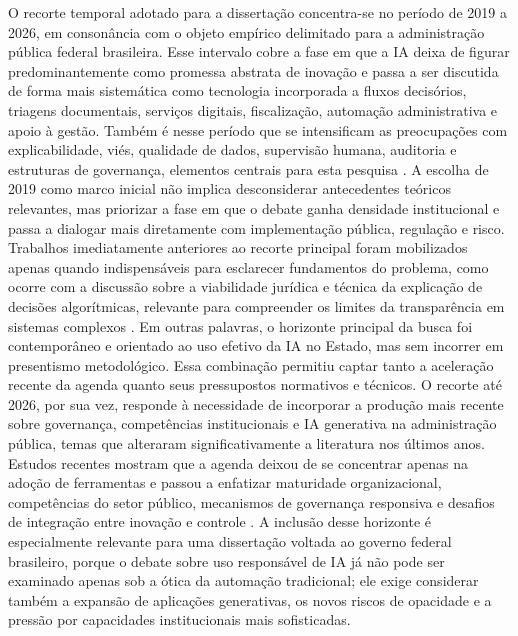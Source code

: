 \documentclass[12pt,a4paper]{article}
\begin{document}
O recorte temporal adotado para a dissertação concentra-se no período de 2019 a 2026, em consonância com o objeto empírico delimitado para a administração pública federal brasileira. Esse intervalo cobre a fase em que a IA deixa de figurar predominantemente como promessa abstrata de inovação e passa a ser discutida de forma mais sistemática como tecnologia incorporada a fluxos decisórios, triagens documentais, serviços digitais, fiscalização, automação administrativa e apoio à gestão. Também é nesse período que se intensificam as preocupações com explicabilidade, viés, qualidade de dados, supervisão humana, auditoria e estruturas de governança, elementos centrais para esta pesquisa \autocite{parycek2023artificial} \autocite{mkander2023auditing} \autocite{minkkinen2022continuous}.
A escolha de 2019 como marco inicial não implica desconsiderar antecedentes teóricos relevantes, mas priorizar a fase em que o debate ganha densidade institucional e passa a dialogar mais diretamente com implementação pública, regulação e risco. Trabalhos imediatamente anteriores ao recorte principal foram mobilizados apenas quando indispensáveis para esclarecer fundamentos do problema, como ocorre com a discussão sobre a viabilidade jurídica e técnica da explicação de decisões algorítmicas, relevante para compreender os limites da transparência em sistemas complexos \autocite{brkan2020legal}. Em outras palavras, o horizonte principal da busca foi contemporâneo e orientado ao uso efetivo da IA no Estado, mas sem incorrer em presentismo metodológico. Essa combinação permitiu captar tanto a aceleração recente da agenda quanto seus pressupostos normativos e técnicos.
O recorte até 2026, por sua vez, responde à necessidade de incorporar a produção mais recente sobre governança, competências institucionais e IA generativa na administração pública, temas que alteraram significativamente a literatura nos últimos anos. Estudos recentes mostram que a agenda deixou de se concentrar apenas na adoção de ferramentas e passou a enfatizar maturidade organizacional, competências do setor público, mecanismos de governança responsiva e desafios de integração entre inovação e controle \autocite{melo2026competencias} \autocite{mariano2026inteligencia} \autocite{lyrio2025emerging}. A inclusão desse horizonte é especialmente relevante para uma dissertação voltada ao governo federal brasileiro, porque o debate sobre uso responsável de IA já não pode ser examinado apenas sob a ótica da automação tradicional; ele exige considerar também a expansão de aplicações generativas, os novos riscos de opacidade e a pressão por capacidades institucionais mais sofisticadas.
\end{document}
